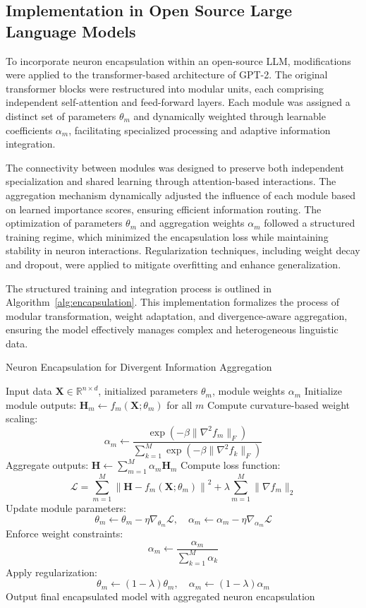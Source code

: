 \documentclass{article}
\begin{document}
\subsection{Implementation in Open Source Large Language Models}

To incorporate neuron encapsulation within an open-source LLM, modifications were applied to the transformer-based architecture of GPT-2. The original transformer blocks were restructured into modular units, each comprising independent self-attention and feed-forward layers. Each module was assigned a distinct set of parameters \( \theta_m \) and dynamically weighted through learnable coefficients \( \alpha_m \), facilitating specialized processing and adaptive information integration.

The connectivity between modules was designed to preserve both independent specialization and shared learning through attention-based interactions. The aggregation mechanism dynamically adjusted the influence of each module based on learned importance scores, ensuring efficient information routing. The optimization of parameters \( \theta_m \) and aggregation weights \( \alpha_m \) followed a structured training regime, which minimized the encapsulation loss while maintaining stability in neuron interactions. Regularization techniques, including weight decay and dropout, were applied to mitigate overfitting and enhance generalization.

The structured training and integration process is outlined in Algorithm~\ref{alg:encapsulation}. This implementation formalizes the process of modular transformation, weight adaptation, and divergence-aware aggregation, ensuring the model effectively manages complex and heterogeneous linguistic data.

\begin{algorithm}
	\caption{Neuron Encapsulation for Divergent Information Aggregation}
	\label{alg:encapsulation}
	\begin{algorithmic}[1]
		\Require Input data \( \mathbf{X} \in \mathbb{R}^{n \times d} \), initialized parameters \( \theta_m \), module weights \( \alpha_m \)
		\State Initialize module outputs: \( \mathbf{H}_m \gets f_m(\mathbf{X}; \theta_m) \) for all \( m \)
		\State Compute curvature-based weight scaling:
		\[
		\alpha_m \gets \frac{\exp(-\beta \|\nabla^2 f_m\|_F)}{\sum_{k=1}^{M} \exp(-\beta \|\nabla^2 f_k\|_F)}
		\]
		\State Aggregate outputs: \( \mathbf{H} \gets \sum_{m=1}^{M} \alpha_m \mathbf{H}_m \)
		\State Compute loss function:
		\[
		\mathcal{L} = \sum_{m=1}^{M} \left\| \mathbf{H} - f_m(\mathbf{X}; \theta_m) \right\|^2 + \lambda \sum_{m=1}^{M} \|\nabla f_m\|_2
		\]
		\State Update module parameters:
		\[
		\theta_m \gets \theta_m - \eta \nabla_{\theta_m} \mathcal{L}, \quad \alpha_m \gets \alpha_m - \eta \nabla_{\alpha_m} \mathcal{L}
		\]
		\State Enforce weight constraints: 
		\[
		\alpha_m \gets \frac{\alpha_m}{\sum_{k=1}^{M} \alpha_k}
		\]
		\State Apply regularization:
		\[
		\theta_m \gets (1 - \lambda) \theta_m, \quad \alpha_m \gets (1 - \lambda) \alpha_m
		\]
		\EndFor
		\State Output final encapsulated model with aggregated neuron encapsulation
	\end{algorithmic}
\end{algorithm}
\end{document}
